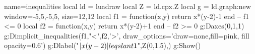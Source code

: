 \documentclass{standalone}%
\begin{document}
\begin{luadraw}{name=inequalities}
local ld = luadraw
local Z = ld.cpx.Z
local g = ld.graph:new{ window={-5,5,-5,5}, size={12,12} }
local f1 = function(x,y) return x*(y-2)-1 end -- f1 <= 0
local f2 = function(x,y) return x*(y-2)+1 end -- f2 >= 0
g:Daxes({0,1,1})
g:Dimplicit_inequalities({f1,"<",f2,'>'}, {draw_options='draw=none,fill=pink, fill opacity=0.6'})
g:Dlabel("$|x(y-2)|\\leqslant 1$",Z(0,1.5),{})
g:Show()
\end{luadraw}
\end{document}
